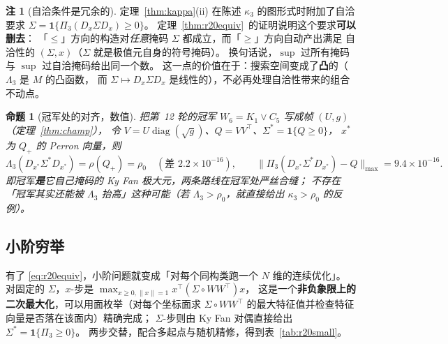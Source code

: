 \documentclass[UTF8,11pt]{ctexart}
\newtheorem{proposition}[theorem]{命题}
\theoremstyle{definition}
\newtheorem{remark}[theorem]{注}
\newcommand{\Lam}{\Lambda}
\begin{document}
\begin{remark}[自洽条件是冗余的]\label{rem:r20selfcons}
定理~\ref{thm:kappa}(ii) 在陈述 $\kappa_3$ 的图形式时附加了自洽要求
$\Sigma=\mathbf 1\{\Pi_3(D_x\Sigma D_x)\ge0\}$。
定理~\ref{thm:r20equiv}~的证明说明这个要求\textbf{可以删去}：
「$\le$」方向的构造对\emph{任意}掩码 $\Sigma$ 都成立，而「$\ge$」方向自动产出满足
自洽性的 $(\Sigma,x)$（$\Sigma$ 就是极值元自身的符号掩码）。
换句话说，$\sup$ 过所有掩码与 $\sup$ 过自洽掩码给出同一个数。
这一点的价值在于：搜索空间变成了\textbf{凸}的（$\Lam_3$ 是 $M$ 的凸函数，
而 $\Sigma\mapsto D_x\Sigma D_x$ 是线性的），不必再处理自洽性带来的组合不动点。
\end{remark}

\begin{proposition}[冠军处的对齐，数值]\label{prop:r20align}
把第~12 轮的冠军 $W_6=K_1\vee C_5$ 写成帧 $(U,g)$（定理~\ref{thm:champ}），
令 $V=U\operatorname{diag}(\sqrt g)$、$Q=VV^\top$、$\Sigma^*=\mathbf 1\{Q\ge0\}$，
$x^*$ 为 $Q_+$ 的 Perron 向量，则
\[
\Lam_3(D_{x^*}\Sigma^*D_{x^*})=\rho(Q_+)=\rho_0\quad(\text{差 }2.2\times10^{-16}),
\qquad \|\Pi_3(D_{x^*}\Sigma^*D_{x^*})-Q\|_{\max}=9.4\times10^{-16}.
\]
即冠军\textbf{是}它自己掩码的 Ky Fan 极大元，两条路线在冠军处严丝合缝；
不存在「冠军其实还能被 $\Lam_3$ 抬高」这种可能（若 $\Lam_3>\rho_0$，就直接给出 $\kappa_3>\rho_0$ 的反例）。
\end{proposition}

\subsection{小阶穷举}\label{sec:r20:small}

有了 \eqref{eq:r20equiv}，小阶问题就变成「对每个同构类跑一个 $N$ 维的连续优化」。
对固定的 $\Sigma$，$x$-步是 $\max_{x\ge0,\|x\|=1}x^\top(\Sigma\circ WW^\top)x$，
这是一个\textbf{非负象限上的二次最大化}，可以用面枚举（对每个坐标面求
$\Sigma\circ WW^\top$ 的最大特征值并检查特征向量是否落在该面内）精确完成；
$\Sigma$-步则由 Ky Fan 对偶直接给出 $\Sigma^*=\mathbf 1\{\Pi_3\ge0\}$。
两步交替，配合多起点与随机精修，得到表~\ref{tab:r20small}。
\end{document}
